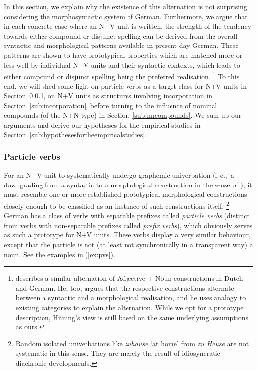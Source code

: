 \documentclass[biblatex, charis, linguex]{glossa}\usepackage{knitr}
\newcommand{\ie}{i.\,e.,\ }
\begin{document}
In this section, we explain why the existence of this alternation is not surprising considering the morphosyntactic system of German.
Furthermore, we argue that in each concrete case where an N+V unit is written, the strength of the tendency towards either compound or disjunct spelling can be derived from the overall syntactic and morphological patterns available in present-day German.
These patterns are shown to have prototypical properties which are matched more or less well by individual N+V units and their syntactic contexts, which leads to either compound or disjunct spelling being the preferred realisation.%
\footnote{\citet{Huening2010} describes a similar alternation of Adjective + Noun constructions in Dutch and German.
He, too, argues that the respective constructions alternate between a syntactic and a morphological realisation, and he uses analogy to existing categories to explain the alternation.
While we opt for a prototype description, Hüning's view is still based on the same underlying assumptions as ours.}
To this end, we will shed some light on particle verbs as a target class for N+V units in Section~\mbox{\ref{sub:particleverbs}}, on N+V units as structures involving incorporation in Section~\mbox{\ref{sub:incorporation}}, before turning to the influence of nominal compounds (of the N+N type) in Section~\mbox{\ref{sub:nncompounds}}.
We sum up our arguments and derive our hypotheses for the empirical studies in Section~\ref{sub:hypothesesfortheempiricalstudies}.

\subsubsection{Particle verbs}
\label{sub:particleverbs}

For an N+V unit to systematically undergo graphemic univerbation (\ie a downgrading from a syntactic to a morphological construction in the sense of \citealt[206]{Lehmann2020}), it must resemble one or more established prototypical morphological constructions closely enough to be classified as an instance of such constructions itself.%
\footnote{Random isolated univerbations like \textit{zuhause} `at home' from \textit{zu Hause} are not systematic in this sense.
They are merely the result of idiosyncratic diachronic developments.}
German has a class of verbs with separable prefixes called \textit{particle verbs} (distinct from verbs with non-separable prefixes called \textit{prefix verbs}), which obviously serves as such a prototype for N+V units.
These verbs display a very similar behaviour, except that the particle is not (at least not synchronically in a transparent way) a noun.
See the examples in (\ref{ex:pvs}).
\end{document}

